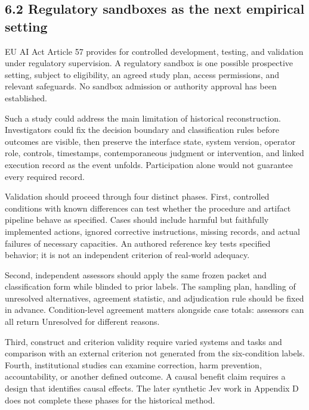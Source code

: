 \documentclass[11pt]{article}
\begin{document}
\subsection*{6.2 Regulatory sandboxes as the next empirical setting}

EU AI Act Article 57 provides for controlled development, testing, and validation under regulatory supervision. A regulatory sandbox is one possible prospective setting, subject to eligibility, an agreed study plan, access permissions, and relevant safeguards. No sandbox admission or authority approval has been established.

Such a study could address the main limitation of historical reconstruction. Investigators could fix the decision boundary and classification rules before outcomes are visible, then preserve the interface state, system version, operator role, controls, timestamps, contemporaneous judgment or intervention, and linked execution record as the event unfolds. Participation alone would not guarantee every required record.

Validation should proceed through four distinct phases. First, controlled conditions with known differences can test whether the procedure and artifact pipeline behave as specified. Cases should include harmful but faithfully implemented actions, ignored corrective instructions, missing records, and actual failures of necessary capacities. An authored reference key tests specified behavior; it is not an independent criterion of real-world adequacy.

Second, independent assessors should apply the same frozen packet and classification form while blinded to prior labels. The sampling plan, handling of unresolved alternatives, agreement statistic, and adjudication rule should be fixed in advance. Condition-level agreement matters alongside case totals: assessors can all return Unresolved for different reasons.

Third, construct and criterion validity require varied systems and tasks and comparison with an external criterion not generated from the six-condition labels. Fourth, institutional studies can examine correction, harm prevention, accountability, or another defined outcome. A causal benefit claim requires a design that identifies causal effects. The later synthetic Jev work in Appendix D does not complete these phases for the historical method.
\end{document}
